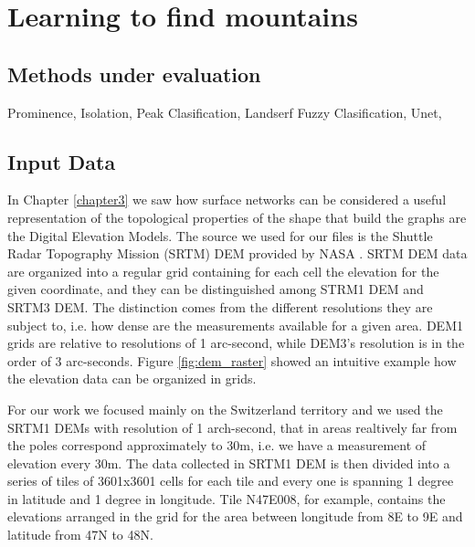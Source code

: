 \chapter{Learning to find mountains}
\label{chapter4}
\thispagestyle{plain}

\section{Methods under evaluation}
Prominence, Isolation, Peak Clasification, Landserf Fuzzy Clasification, Unet,

\section{Input Data}
In Chapter \ref{chapter3} we saw how surface networks can be considered a useful representation of the topological properties of the shape that build the graphs are the Digital Elevation Models. The source we used for our files is the Shuttle Radar Topography Mission (SRTM) DEM provided by NASA \cite{Farr2007RGP}. SRTM DEM data are organized into a regular grid containing for each cell the elevation for the given coordinate, and they can be distinguished among STRM1 DEM and SRTM3 DEM. The distinction comes from the different resolutions they are subject to, i.e. how dense are the measurements available for a given area. DEM1 grids are relative to resolutions of 1 arc-second, while DEM3's resolution is in the order of 3 arc-seconds. Figure \ref{fig:dem_raster} showed an intuitive example how the elevation data can be organized in grids. 

For our work we focused mainly on the Switzerland territory and we used the SRTM1 DEMs with resolution of 1 arch-second, that in areas realtively far from the poles correspond approximately to 30m, i.e. we have a measurement of elevation every 30m. The data collected in SRTM1 DEM is then divided into a series of tiles of 3601x3601 cells for each tile and every one is spanning 1 degree in latitude and 1 degree in longitude. Tile N47E008, for example, contains the elevations arranged in the grid for the area between longitude from 8\degree E to 9\degree E and latitude from 47\degree N to 48\degree N.

